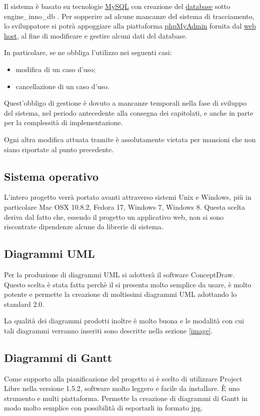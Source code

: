 Il sistema è basato su tecnologie \underline{MySQL} con creazione del \underline{database} sotto engine\_inno\_db . Per sopperire ad alcune mancanze del sistema di tracciamento, lo sviluppatore si potrà appoggiare alla piattaforma \underline{phpMyAdmin} fornita dal \underline{web host}, al fine di modificare e gestire alcuni dati del database.

In particolare, se ne obbliga l'utilizzo nei seguenti casi:
\begin{itemize}
\item modifica di un caso d'uso;
\item cancellazione di un caso d'uso.
\end{itemize}

Quest'obbligo di gestione è dovuto a mancanze temporali nella fase di sviluppo del sistema, nel periodo antecedente alla consegna dei capitolati, e anche in parte per la complessità di implementazione.

Ogni altra modifica attuata tramite  è assolutamente vietata per mansioni che non siano riportate al punto precedente.


\subsection{Sistema operativo}
L'intero progetto verrà portato avanti attraverso sistemi Unix e Windows, più in particolare Mac OSX 10.8.2, Fedora 17, Windows 7, Windows 8. Questa scelta deriva dal fatto che, essendo il progetto \caName{} un applicativo web, non si sono riscontrate dipendenze alcune da librerie di sistema.

\subsection{Diagrammi UML}
Per la produzione di diagrammi UML si adotterà il software ConceptDraw. Questo scelta è stata fatta perchè il  si presenta molto semplice da usare, è molto potente e permette la creazione di moltissimi diagrammi UML adottando lo standard 2.0.

La qualità dei diagrammi prodotti inoltre è molto buona e le modalità con cui tali diagrammi verranno inseriti sono descritte nella sezione \ref{image}.


\subsection{Diagrammi di Gantt}
Come supporto alla pianificazione del progetto si è scelto di utilizzare Project Libre nella versione 1.5.2, software molto leggero e facile da installare. È uno strumento  e multi piattaforma. Permette la creazione di diagrammi di Gantt in modo molto semplice con possibilità di esportarli in formato jpg.

